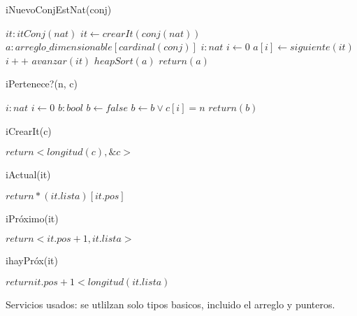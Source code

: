 \begin{algorithm}
\caption{iNuevoConjEstNat(conj)}
\begin{algorithmic}
	\State $it:itConj(nat)$
	\State $it \gets crearIt(conj(nat))$
	\State $a : arreglo\_dimensionable[cardinal(conj)]$
	\State $i : nat$
	\State $i \gets 0$
	\State $a[i] \gets siguiente(it)$
	\State $i++$
	\State $avanzar(it)$
	\EndWhile
	\State $heapSort(a)$
	\State $return(a)$
\end{algorithmic}
\end{algorithm}
	
\begin{algorithm}
\caption{iPertenece?(n, c)}
\begin{algorithmic}
	\State $i : nat$
	\State $i \gets 0$
	\State $b : bool$
	\State $b \gets false$
	\State $b \gets b \lor c[i]=n$
	\EndWhile
	\State $return(b)$
\end{algorithmic}
\end{algorithm}
	
\begin{algorithm}
\caption{iCrearIt(c)}
\begin{algorithmic}
	\State $return <longitud(c), \&c>$ 
\end{algorithmic}
\end{algorithm}

\begin{algorithm}
\caption{iActual(it)}
\begin{algorithmic}
	\State $return *(it.lista)[it.pos]$	
\end{algorithmic}
\end{algorithm}

\begin{algorithm}
\caption{iPr\'oximo(it)}
\begin{algorithmic}
	\State $return <it.pos+1, it.lista>$	
\end{algorithmic}
\end{algorithm}


\begin{algorithm}
\caption{ihayPr\'ox(it)}
\begin{algorithmic}
	\State $return it.pos+1<longitud(it.lista)$	
\end{algorithmic}
\end{algorithm}

Servicios usados: se utlilzan solo tipos basicos, incluido el arreglo y punteros.
